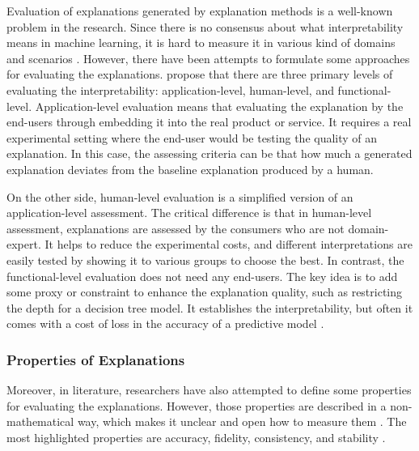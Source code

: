 \documentclass[english]{tktltiki2}
\theoremstyle{definition}
\theoremstyle{remark}
\begin{document}

Evaluation of explanations generated by explanation methods is a well-known problem in the research. Since there is no consensus about what interpretability means in machine learning, it is hard to measure it in various kind of domains and scenarios \citep{molnarinterpretable}. However, there have been attempts to formulate some approaches for evaluating the explanations. \citet{bibal2016interpretability} propose that there are three primary levels of evaluating the interpretability: application-level, human-level, and functional-level. Application-level evaluation means that evaluating the explanation by the end-users through embedding it into the real product or service. It requires a real experimental setting where the end-user would be testing the quality of an explanation. In this case, the assessing criteria can be that how much a generated explanation deviates from the baseline explanation produced by a human.

On the other side, human-level evaluation is a simplified version of an application-level assessment. The critical difference is that in human-level assessment, explanations are assessed by the consumers who are not domain-expert. It helps to reduce the experimental costs, and different interpretations are easily tested by showing it to various groups to choose the best. In contrast, the functional-level evaluation does not need any end-users. The key idea is to add some proxy or constraint to enhance the explanation quality, such as restricting the depth for a decision tree model. It establishes the interpretability, but often it comes with a cost of loss in the accuracy of a predictive model \citep{bibal2016interpretability, molnarinterpretable}.

\subsubsection{Properties of Explanations} %

Moreover, in literature, researchers have also attempted to define some properties for evaluating the explanations. However, those properties are described in a non-mathematical way, which makes it unclear and open how to measure them \citep{robnik2018perturbation}. The most highlighted properties are accuracy, fidelity, consistency, and stability \citep{molnarinterpretable}. 
\end{document}
